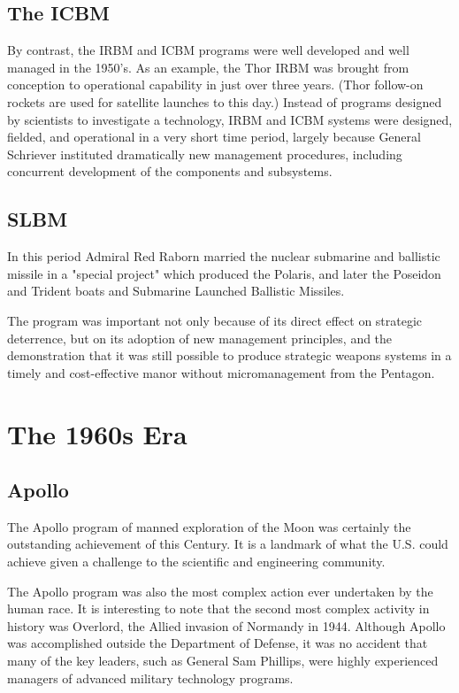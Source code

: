 \subsection{The ICBM}
By contrast, the IRBM and ICBM programs were well developed and well managed in the 1950's. As an example, the Thor IRBM was brought from conception to operational capability in just over three years. (Thor follow-on rockets are used for satellite launches to this day.) Instead of programs designed by scientists to investigate a technology, IRBM and ICBM systems were designed, fielded, and operational in a very short time period, largely because General Schriever instituted dramatically new management procedures, including concurrent development of the components and subsystems.

\subsection{SLBM}
In this period Admiral Red Raborn married the nuclear submarine and ballistic missile in a "special project" which produced the Polaris, and later the Poseidon and Trident boats and Submarine Launched Ballistic Missiles.

The program was important not only because of its direct effect on strategic deterrence, but on its adoption of new management principles, and the demonstration that it was still possible to produce strategic weapons systems in a timely and cost-effective manor without micromanagement from the Pentagon.

\section{The 1960s Era}
\subsection{Apollo}
The Apollo program of manned exploration of the Moon was certainly the outstanding achievement of this Century. It is a landmark of what the U.S. could achieve given a challenge to the scientific and engineering community.

The Apollo program was also the most complex action ever undertaken by the human race. It is interesting to note that the second most complex activity in history was Overlord, the Allied invasion of Normandy in 1944. Although Apollo was accomplished outside the Department of Defense, it was no accident that many of the key leaders, such as General Sam Phillips, were highly experienced managers of advanced military technology programs.

